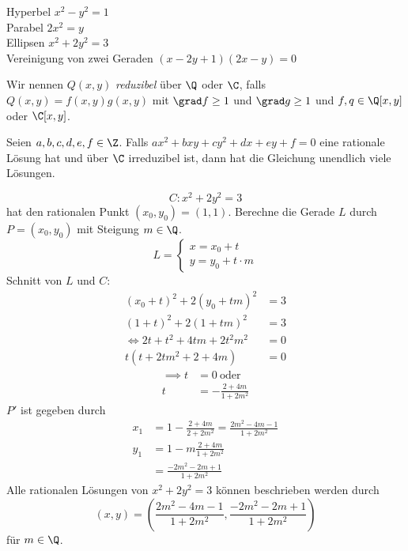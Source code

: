 \begin{exmp*}
	Hyperbel $x^2-y^2 = 1$\\
	Parabel $2x^2=y$\\
	Ellipsen $x^2+2y^2=3$\\
	Vereinigung von zwei Geraden $(x-2y+1)(2x-y)=0$
\end{exmp*}

Wir nennen $Q(x,y)$ \emph{reduzibel} über $\Q$ oder $\C$, falls $Q(x,y) = f(x,y)g(x,y)$ mit $\grad f \geq1$ und $\grad g \geq 1$ und $f,q \in \Q[x,y]$ oder $\C[x,y]$.

\begin{thm}\autolabel
	Seien $a,b,c,d,e,f \in \Z$. Falls $ ax^2+bxy+cy^2+dx+ey+f = 0$ eine rationale Lösung hat und über $\C$ irreduzibel ist, dann hat die Gleichung unendlich viele Lösungen.
\end{thm}

\begin{exmp*}
	\[ C: x^2+2y^2=3 \]
	hat den rationalen Punkt $(x_0,y_0) = (1,1)$. Berechne die Gerade $L$ durch $P = (x_0,y_0)$ mit Steigung $m \in \Q$.
	\[ L = \begin{cases}
		x = x_0 + t\\
		y = y_0 + t \cdot m
	\end{cases} \]
	Schnitt von $L$ und $C$:
	\begin{align*}
		(x_0+t)^2 + 2(y_0+tm)^2 &= 3\\
		(1+t)^2 + 2(1+tm)^2 &= 3\\
		\iff 2t + t^2 + 4tm + 2t^2m^2 &= 0\\
		t(t+2tm^2 + 2 + 4m) &= 0
	\end{align*}
	\begin{align*}
		\implies t &= 0 \ \text{oder}\\
		t &= -\frac{2+4m}{1+2m^2}
	\end{align*}
	$P'$ ist gegeben durch
	\begin{align*}
		x_1 &= 1- \frac{2+4m}{2+2m^2} = \frac{2m^2 - 4m - 1}{1+2m^2}\\
		y_1 &= 1-m \frac{2+4m}{1+2m^2}\\
		&= \frac{-2m^2 - 2m+1}{1+2m^2}
	\end{align*}
	Alle rationalen Lösungen von $x^2+2y^2 = 3$ können beschrieben werden durch
	\[ (x,y) = \left( \frac{2m^2-4m-1}{1+2m^2} , \frac{-2m^2 - 2m + 1}{1 + 2m^2} \right) \]
	für $m \in \Q$.
\end{exmp*}